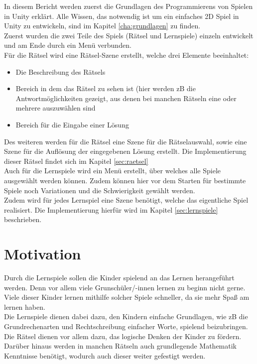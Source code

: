 In diesem Bericht werden zuerst die Grundlagen des Programmierens von Spielen in Unity erklärt. Alle Wissen, das notwendig ist um ein einfaches 2D Spiel in Unity zu entwickeln, sind im Kapitel \ref{cha:grundlagen} zu finden.\\
Zuerst wurden die zwei Teile des Spiels (Rätsel und Lernspiele) einzeln entwickelt und am Ende durch ein Menü verbunden.\\
Für die Rätsel wird eine Rätsel-Szene erstellt, welche drei Elemente beeinhaltet:
\begin{itemize}
	\item Die Beschreibung des Rätsels
	\item Bereich in dem das Rätsel zu sehen ist (hier werden zB die Antwortmöglichkeiten gezeigt, aus denen bei manchen Rätseln eine oder mehrere auszuwählen sind %
	\item Bereich für die Eingabe einer Lösung
\end{itemize}
Des weiteren werden für die Rätsel eine Szene für die Rätselauswahl, sowie eine Szene für die Auflösung der eingegebenen Lösung erstellt. Die Implementierung dieser Rätsel findet sich im Kapitel \ref{sec:raetsel}\\

Auch für die Lernspiele wird ein Menü erstellt, über welches alle Spiele ausgewählt werden können. Zudem können hier vor dem Starten für bestimmte Spiele noch Variationen und die Schwierigkeit gewählt werden. \\
Zudem wird für jedes Lernspiel eine Szene benötigt, welche das eigentliche Spiel realisiert. Die Implementierung hierfür wird im Kapitel \ref{sec:lernspiele} beschrieben.\\

\section{Motivation}
\label{sec:motivation}

Durch die Lernspiele sollen die Kinder spielend an das Lernen herangeführt werden. Denn vor allem viele Grunschüler/-innen lernen zu beginn nicht gerne. Viele dieser Kinder lernen mithilfe solcher Spiele schneller, da sie mehr Spaß am lernen haben. \\
Die Lernspiele dienen dabei dazu, den Kindern einfache Grundlagen, wie zB die Grundrechenarten und Rechtschreibung einfacher Worte, spielend beizubringen. Die Rätsel dienen vor allem dazu, das logische Denken der Kinder zu fördern. Darüber hinaus werden in manchen Rätseln auch grundlegende Mathematik Kenntnisse benötigt, wodurch auch dieser weiter gefestigt werden.

